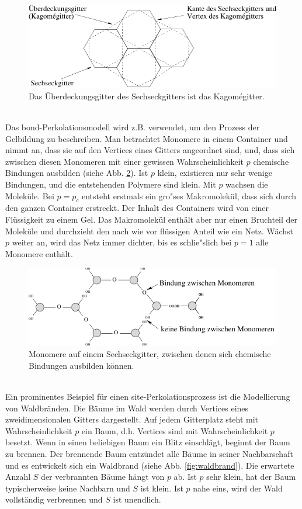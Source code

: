 \begin{figure}[htbp]
  \centering
  \includegraphics{./Einleitung-figs/cov}
  \caption{Das \"Uberdeckungsgitter des Sechseckgitters ist das Kagom\'egitter.}
  \label{fig:covering_einleit}
\end{figure}
\\Das bond-Perkolationsmodell wird z.B. verwendet, um den Prozess der Gelbildung zu beschreiben. Man betrachtet Monomere in einem Container und nimmt an, dass sie auf den Vertices eines Gitters angeordnet sind, und, dass sich zwischen diesen Monomeren mit einer gewissen Wahrscheinlichkeit $p$ chemische Bindungen ausbilden (siehe Abb. \ref{fig:gel}). Ist $p$ klein, existieren nur sehr wenige Bindungen, und die entstehenden Polymere sind klein. Mit $p$ wachsen die Molek\"ule. Bei $p=p_c$ entsteht erstmals ein gro"ses Makromolek\"ul, dass sich durch den ganzen Container erstreckt. Der Inhalt des Containers wird von einer Fl\"ussigkeit zu einem Gel. Das Makromolek\"ul enth\"alt aber nur einen Bruchteil der Molek\"ule und durchzieht den nach wie vor fl\"ussigen Anteil wie ein Netz. W\"achst $p$ weiter an, wird das Netz immer dichter, bis es schlie"slich bei $p=1$ alle Monomere enth\"alt.
\begin{figure}[tbp]
  \centering
  \includegraphics{./Einleitung-figs/gel}
  \caption{Monomere auf einem Sechseckgitter, zwischen denen sich chemische Bindungen ausbilden k\"onnen.}
  \label{fig:gel}
\end{figure}
\\Ein prominentes Beispiel f\"ur einen site-Perkolationsprozess ist die Modellierung von Waldbr\"anden. Die B\"aume im Wald werden durch Vertices eines zweidimensionalen Gitters dargestellt. Auf jedem Gitterplatz steht mit Wahrscheinlichkeit $p$ ein Baum, d.h. Vertices sind mit Wahrscheinlichkeit $p$ besetzt. Wenn in einen beliebigen Baum ein Blitz einschl\"agt, beginnt der Baum zu brennen. Der brennende Baum entz\"undet alle B\"aume in seiner Nachbarschaft und es entwickelt sich ein Waldbrand (siehe Abb. \ref{fig:waldbrand}). Die erwartete Anzahl $S$ der verbrannten B\"aume h\"angt von $p$ ab. Ist $p$ sehr klein, hat der Baum typischerweise keine Nachbarn und $S$ ist klein. Ist $p$ nahe eins, wird der Wald vollst\"andig verbrennen und $S$ ist unendlich. 

